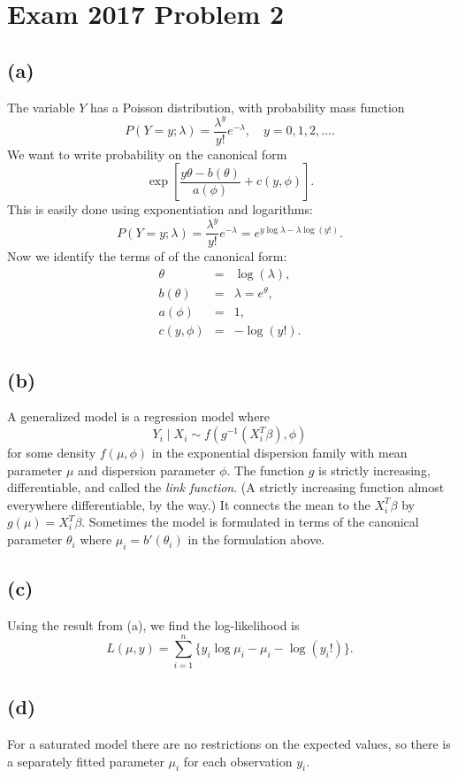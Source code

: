 \section*{Exam 2017 Problem 2}

\subsection*{(a)}
The variable $Y$ has a Poisson distribution, with probability mass
function
\[
P(Y=y;\lambda)=\frac{\lambda^{y}}{y!}e^{-\lambda},\quad y=0,1,2,\ldots.
\]
We want to write probability on the canonical form
\[
\exp\left[\frac{y\theta-b(\theta)}{a(\phi)}+c(y,\phi)\right].
\]
This is easily done using exponentiation and logarithms:
\[
P(Y=y;\lambda)=\frac{\lambda^{y}}{y!}e^{-\lambda}=e^{y\log\lambda-\lambda\log(y!)}.
\]
Now we identify the terms of of the canonical form:
\begin{eqnarray*}
\theta & = & \log(\lambda),\\
b(\theta) & = & \lambda=e^{\theta},\\
a(\phi) & = & 1,\\
c(y,\phi) & = & -\log(y!).
\end{eqnarray*}

\subsection*{(b)}
A generalized model is a regression model where
\[
Y_{i}\mid X_{i}\sim f(g^{-1}(X_{i}^{T}\beta),\phi)
\]
for some density $f(\mu,\phi)$ in the exponential dispersion family
with mean parameter $\mu$ and dispersion parameter $\phi$. The function
$g$ is strictly increasing, differentiable, and called the \emph{link
function}. (A strictly increasing function almost everywhere differentiable,
by the way.) It connects the mean to the $X_{i}^{T}\beta$ by $g(\mu)=X_{i}^{T}\beta$.
Sometimes the model is formulated in terms of the canonical parameter
$\theta_{i}$ where $\mu_{i}=b'(\theta_{i})$ in the formulation above.
\subsection*{(c)}
Using the result from (a), we find the log-likelihood is
\[
L(\mu,y)=\sum_{i=1}^{n}\{y_{i}\log\mu_{i}-\mu_{i}-\log(y_{i}!)\}.
\]
\subsection*{(d)}
For a saturated model there are no restrictions on the expected values,
so there is a separately fitted parameter $\mu_{i}$ for each observation
$y_{i}$.

